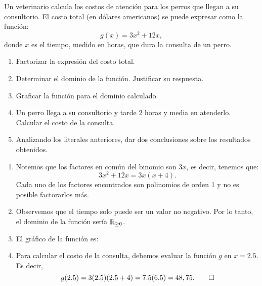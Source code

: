 \documentclass[11pt,a4]{aleph-examen}
\begin{document}
\begin{preguntas}
\item 
    Un veterinario calcula los costos de atención para los perros que llegan a su consultorio. El costo total (en dólares americanos) se puede expresar como la función:
    \[
        g(x) = 3x^2 + 12x,
    \]
    donde $x$ es el tiempo, medido en horas, que dura la consulta de un perro.
    \begin{enumerate}[label=\textit{\alph*)}]
    \item 
        Factorizar la expresión del costo total.
    \item 
        Determinar el dominio de la función. Justificar su respuesta.
    \item 
        Graficar la función para el dominio calculado.
    \item 
        Un perro llega a su consultorio y tarde 2 horas y media en atenderlo. Calcular el costo de la consulta.
    \item 
        Analizando los literales anteriores, dar dos conclusiones sobre los resultados obtenidos.
    \end{enumerate}
\begin{respuesta}
\begin{enumerate}[label=\textit{\alph*)}]
	\item 
        Notemos que los factores en com\'un del binomio son $3x$, es decir, tenemos que:
    	\[
    	   3x^2 + 12x = 3x(x+4).
    	\]
    	Cada uno de los factores encontrados son polinomios de orden 1 y no es posible factorarlos más.
    	
    \item 
        Observemos que el tiempo solo puede ser un valor no negativo. Por lo tanto, el dominio de la función ser\'ia $\mathbb{R}_{\geq 0}$.
	
    \item 
        El gráfico de la función es:
        \begin{center}
        \end{center}
    
	\item 
        Para calcular el costo de la consulta, debemos evaluar la función $g$ en $x = 2.5$. Es decir,
    	\[
    	   g(2.5) = 3(2.5) (2.5+4) = 7.5(6.5) = 48,75.\qedhere
    	\]
\end{enumerate}
\end{respuesta}

\end{preguntas}
\end{document}
